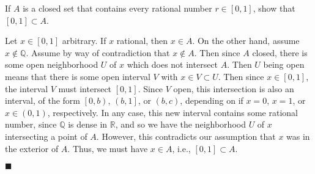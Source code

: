 \documentclass[12pt]{article}
\renewcommand{\qed}{\hfill$\blacksquare$}
\renewenvironment{proof}{\begin{addmargin}[1em]{0em}\begin{newproof}}{\end{newproof}\end{addmargin}\qed}
\newenvironment{problem}[2][Problem]{\begin{trivlist}
\item[\hskip \labelsep {\bfseries #1}\hskip \labelsep {\bfseries #2.}]}{\end{trivlist}}
\begin{document}
 
 
\begin{problem}{1-19}
If $A$ is a closed set that contains every rational number $r \in \left[0,1\right]$, show that $\left[0,1\right] \subset A$.
\end{problem}
\begin{proof}
Let $x \in \left[0,1\right]$ arbitrary. If $x$ rational, then $x\in A$. On the other hand, assume $x \notin \mathbb{Q}$. Assume by way of contradiction that $x \notin A$. Then since $A$ closed, there is some open neighborhood $U$ of $x$ which does not intersect $A$. Then $U$ being open means that there is some open interval $V$ with $x \in V \subset U$. Then since $x \in \left[0,1\right]$, the interval $V$ must intersect $\left[0,1\right]$. Since $V$ open, this intersection is also an interval, of the form $\left[0,b\right)$, $\left(b,1\right]$, or $\left(b,c\right)$, depending on if $x=0$, $x=1$, or $x\in \left(0,1\right)$, respectively. In any case, this new interval contains some rational number, since $\mathbb{Q}$ is dense in $\mathbb{R}$, and so we have the neighborhood $U$ of $x$ intersecting a point of $A$. However, this contradicts our assumption that $x$ was in the exterior of $A$. Thus, we must have $x \in A$, i.e., $\left[0,1\right] \subset A$.
\end{proof} 
 
 
 
\end{document}
